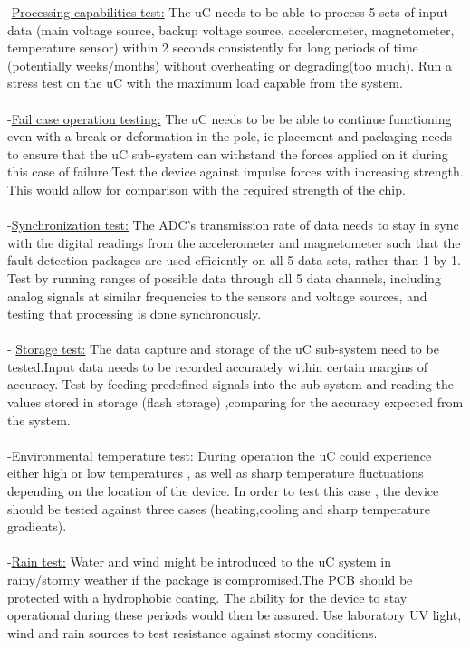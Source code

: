 \documentclass[12pt]{article}
\begin{document}
-\underline{Processing capabilities test:} The uC needs to be able to process 5 sets of input data (main voltage source, backup voltage source, accelerometer, magnetometer, temperature sensor) within 2 seconds consistently for long periods of time (potentially weeks/months) without overheating or degrading(too much). Run a stress test on the uC with the maximum load capable from the system.\\
\\
-\underline{Fail case operation testing:} The uC needs to be be able to continue functioning even with a break or deformation in the pole, ie placement and packaging needs to ensure that the uC sub-system can withstand the forces applied on it during this case of failure.Test the device against impulse forces with increasing strength. This would allow for comparison with the required strength of the chip.\\
\\
-\underline{Synchronization test:} The ADC's transmission rate of data needs to stay in sync with the digital readings from the accelerometer and magnetometer such that the fault detection packages are used efficiently on all 5 data sets, rather than 1 by 1. Test by running ranges of possible data through all 5 data channels, including analog signals at similar frequencies to the sensors and voltage sources, and testing that processing is done synchronously.\\
\\
- \underline{Storage test:} The data capture and storage of the uC sub-system need to be tested.Input data needs to be recorded accurately within certain margins of accuracy. Test by feeding predefined signals into the sub-system and reading the values stored in storage (flash storage) ,comparing for the accuracy expected from the system.\\ 
\\
-\underline{Environmental temperature test:} During operation the uC could experience either high or low temperatures , as well as sharp temperature fluctuations depending on the location of the device. In order to test this case , the device should be tested against three cases (heating,cooling and sharp temperature gradients).\\
\\
-\underline{Rain test:} Water and wind might be introduced to the uC system in rainy/stormy weather if the package is compromised.The PCB should be protected with a hydrophobic coating. The ability for the device to stay operational during these periods would then be assured. Use laboratory UV light, wind and rain sources to test resistance against stormy conditions.\\
\end{document}
